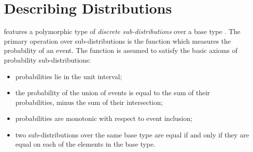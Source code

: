 %
%
%
%
%
%
%

\section{Describing Distributions\label{sec:distributions}}

\EC features a polymorphic type  of \emph{discrete
sub-distributions} over a base type . The primary operation over
sub-distributions is the function  which measures the probability of an event. The function is assumed to
satisfy the basic axioms of probability sub-distributions:
\begin{itemize}
\item probabilities lie in the unit interval;
\item the probability of the union of events is equal to the sum of
  their probabilities, minus the sum of their intersection;
\item probabilities are monotonic with respect to event inclusion;
\item two sub-distributions over the same base type are equal if and only if
  they are equal on each of the elements in the base type.
\end{itemize}

